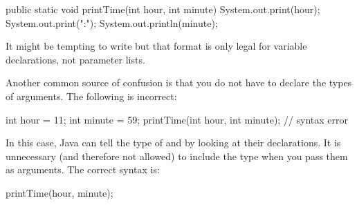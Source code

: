 \begin{code}
    public static void printTime(int hour, int minute) {
        System.out.print(hour);
        System.out.print(":");
        System.out.println(minute);
    }
\end{code}

It might be tempting to write  but that format is only legal for variable declarations, not parameter lists.

Another common source of confusion is that you do not have to declare the types of arguments.
The following is incorrect:

\begin{code}
    int hour = 11;
    int minute = 59;
    printTime(int hour, int minute);  // syntax error
\end{code}

In this case, Java can tell the type of  and  by looking at their declarations.
It is unnecessary (and therefore not allowed) to include the type when you pass them as arguments.
The correct syntax is:

\begin{code}
    printTime(hour, minute);
\end{code}


%
%
%
%
%
%
%
%


